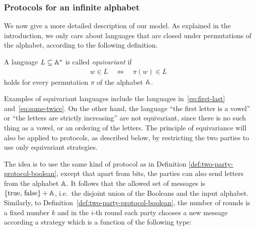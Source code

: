 


\subsubsection{Protocols for an infinite alphabet}
\label{sec:protocols-infinite-alphabet}
We now give a more detailed description of our model. As explained in the introduction, we only care about languages that are closed under permutations of the alphabet, according to the following definition. 

\begin{definition} \label{def:equivariant-language}
    A language $L \subseteq \mathbb A^*$ is called \emph{equivariant} if 
    \begin{align*}
    w \in L \quad \iff \quad \pi(w) \in L
    \end{align*}
    holds for every permutation $\pi$ of the alphabet $\mathbb A$.
\end{definition}

Examples of equivariant languages include the languages in~\eqref{eq:first-last} and~\eqref{eq:some-twice}. On the other hand, the language ``the first letter is a vowel'' or ``the letters are strictly increasing'' are not equivariant, since there is no such thing as a vowel, or an ordering of the letters. The principle of equivariance will also be applied to protocols, as described below, by restricting the two parties to use only equivariant strategies.





The idea is to use the same kind of protocol as in Definition \ref{def:two-party-protocol-boolean}, except that apart from bits, the parties can also send letters from the alphabet $\mathbb A$. It follows that the allowed set of messages is 
$\{\text{true, false}\} + \mathbb A$, i.e.~the disjoint union of the Booleans and the input alphabet. Similarly, to Definition~\ref{def:two-party-protocol-boolean}, the number of rounds is a fixed number $k$ and in the $i$-th round each party chooses 
a new message according a strategy which is a function of the following type: 

